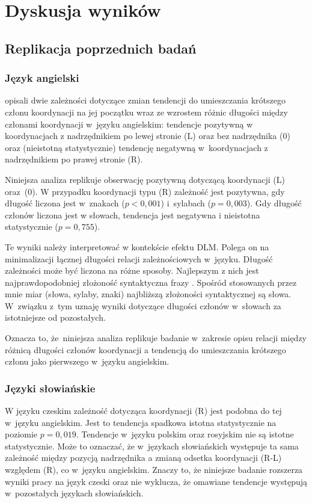 \chapter{Dyskusja wyników} \label{ch6}

\section{Replikacja poprzednich badań}

\subsection{Język angielski}

\cite{przepiorkowski2023conjunct} opisali dwie zależności dotyczące zmian tendencji do umieszczania krótszego członu koordynacji na jej początku wraz ze wzrostem różnic długości między członami koordynacji w~języku angielskim: tendencje pozytywną w koordynacjach z nadrzędnikiem po lewej stronie (L) oraz bez nadrzędnika (0) oraz (nieistotną statystycznie) tendencję negatywną w~koordynacjach z nadrzędnikiem po prawej stronie (R).

Niniejsza analiza replikuje obserwację pozytywną dotyczącą koordynacji (L) oraz~(0). W przypadku koordynacji typu (R) zależność jest pozytywna, gdy długość liczona jest w~znakach ($p<0,001$) i~sylabach ($p=0,003$).
Gdy długość członów liczona jest w słowach, tendencja jest negatywna i nieistotna statystycznie ($p=0,755$).

Te wyniki należy interpretować w kontekście efektu DLM. Polega on na minimalizacji łącznej długości relacji zależnościowych w~języku. Długość zależności może być liczona na różne sposoby. Najlepszym z nich jest najprawdopodobniej złożoność syntaktyczna frazy \citep{lohmann2014english}. Spośród stosowanych przez mnie miar (słowa, sylaby, znaki) najbliższą złożoności syntaktycznej są słowa. W~związku z~tym uznaję wyniki dotyczące długości członów w~słowach za istotniejsze od pozostałych.

Oznacza to, że~niniejsza analiza replikuje badanie \cite{przepiorkowski2023conjunct} w~zakresie opisu relacji między różnicą długości członów koordynacji a tendencją do umieszczania krótszego członu jako pierwszego w~języku angielskim.

\subsection{Języki słowiańskie}

W języku czeskim zależność dotycząca koordynacji (R) jest podobna do tej w~języku angielskim. Jest to tendencja spadkowa istotna statystycznie na poziomie $p=0,019$. Tendencje w~języku polskim oraz rosyjskim nie są istotne statystycznie. Może to oznaczać, że w~językach słowiańskich występuje ta sama zależność między pozycją nadrzędnika a zmianą odsetka koordynacji (R-L) względem (R), co w~języku angielskim. Znaczy to, że niniejsze badanie rozszerza wyniki pracy \cite{przepiorkowski2023conjunct} na język czeski oraz nie wyklucza, że omawiane tendencje występują w~pozostałych językach słowiańskich.

